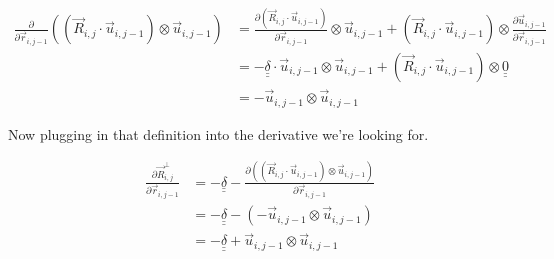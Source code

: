 \documentclass{article}
\renewcommand{\ij}{_{i,j}}
\newcommand{\ijj}{_{i,j-1}}
\newcommand{\ijjj}{_{i,j-2}}
\newcommand{\magn}[1]{\left\vert #1 \right\vert }
\renewcommand{\part}[2]{\frac{\partial #1 }{\partial #2}}
\newcommand{\partbig}[2]{\frac{\partial }{\partial #2}\left( #1 \right)}
\newcommand{\ten}[1]{\underline{\underline{#1}}}
\newcommand{\rij}{\vec{r} \ij}
\newcommand{\Rij}{\vec{R} \ij}
\newcommand{\rijj}{\vec{r} \ijj}
\newcommand{\rijjj}{\vec{r} \ijjj}
\newcommand{\uijj}{\vec{u} \ijj}
\begin{document}
\begin{align*}
  \partbig{\left(\vec{R}\ij \cdot \vec{u} \ijj \right) \otimes 
  \vec{u} \ijj 
  }{\vec{r}\ijj}
  &= 
  \part{\left(\vec{R}\ij \cdot \vec{u} \ijj \right)}{\vec{r}\ijj} \otimes
  \uijj 
  +
  \left(\vec{R}\ij \cdot \vec{u} \ijj \right) \otimes
  \part{\uijj }{\vec{r}\ijj} 
  \\
  &= 
  - \ten{\delta} \cdot \uijj 
  \otimes \uijj 
  + \left(\Rij \cdot \uijj \right) \otimes \ten{0}
  \\
  &= 
  - \uijj \otimes \uijj
\end{align*}

Now plugging in that definition into the derivative we're looking for.

\begin{align*}
  \part{\vec{R}\ij ^ \bot}{\vec{r}\ijj}  &= - \ten{\delta} 
  - \part{\left(\left(\vec{R}\ij \cdot \uijj \right) \otimes 
  \vec{u} \ijj \right)
  }{\vec{r}\ijj} 
  \\
  &= -
  \ten{\delta}
  -
  \left( - \uijj \otimes \uijj \right)
  \\
  &= 
  -
  \ten{\delta} + 
  \uijj \otimes \uijj 
\end{align*}
\end{document}
